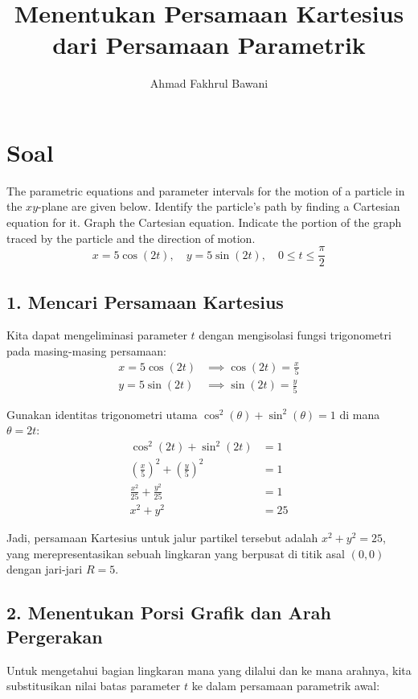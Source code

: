\documentclass[12pt,a4paper]{article}
\title{Menentukan Persamaan Kartesius dari Persamaan Parametrik}
\author{Ahmad Fakhrul Bawani}
\date{}
\begin{document}
\maketitle

\section*{Soal}

The parametric equations and parameter intervals for the motion of a particle in the $xy$-plane are given below. Identify the particle's path by finding a Cartesian equation for it. Graph the Cartesian equation. Indicate the portion of the graph traced by the particle and the direction of motion.
\begin{equation*}
  x = 5\cos(2t), \quad y = 5\sin(2t), \quad 0 \le t \le \frac{\pi}{2}
\end{equation*}

\subsection*{1. Mencari Persamaan Kartesius}
Kita dapat mengeliminasi parameter $t$ dengan mengisolasi fungsi trigonometri pada masing-masing persamaan:
\begin{align*}
  x = 5\cos(2t) &\implies \cos(2t) = \frac{x}{5} \\
  y = 5\sin(2t) &\implies \sin(2t) = \frac{y}{5}
\end{align*}

Gunakan identitas trigonometri utama $\cos^2(\theta) + \sin^2(\theta) = 1$ di mana $\theta = 2t$:
\begin{align*}
  \cos^2(2t) + \sin^2(2t) &= 1 \\
  \left(\frac{x}{5}\right)^2 + \left(\frac{y}{5}\right)^2 &= 1 \\
  \frac{x^2}{25} + \frac{y^2}{25} &= 1 \\
  x^2 + y^2 &= 25
\end{align*}

Jadi, persamaan Kartesius untuk jalur partikel tersebut adalah \textbf{$x^2 + y^2 = 25$}, yang merepresentasikan sebuah lingkaran yang berpusat di titik asal $(0,0)$ dengan jari-jari $R = 5$.

\subsection*{2. Menentukan Porsi Grafik dan Arah Pergerakan}
Untuk mengetahui bagian lingkaran mana yang dilalui dan ke mana arahnya, kita substitusikan nilai batas parameter $t$ ke dalam persamaan parametrik awal:
\end{document}
